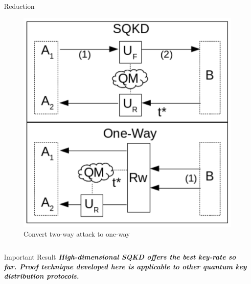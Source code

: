 \documentclass[final]{beamer}
\newlength{\onecolwid}
\newlength{\twocolwid}
\begin{document}
\begin{frame}[t]
\begin{columns}[t]
\begin{column}{\twocolwid}
\begin{columns}[t,totalwidth=\twocolwid]
\begin{column}{\onecolwid}\vspace{-.6in} %


\begin{block}{Reduction}
\begin{figure}
	\includegraphics[width=0.8\linewidth]{oneway.png}
	\caption{Convert two-way attack to one-way}
\end{figure}


\end{block}


\end{column} %

\end{columns} %


\begin{alertblock}{Important Result}
\textbf{\textit{High-dimensional SQKD offers the best key-rate so far. Proof technique developed here is applicable to other quantum key distribution protocols.}}
\end{alertblock} 


\end{column}
\end{columns}
\end{frame}
\end{document}
